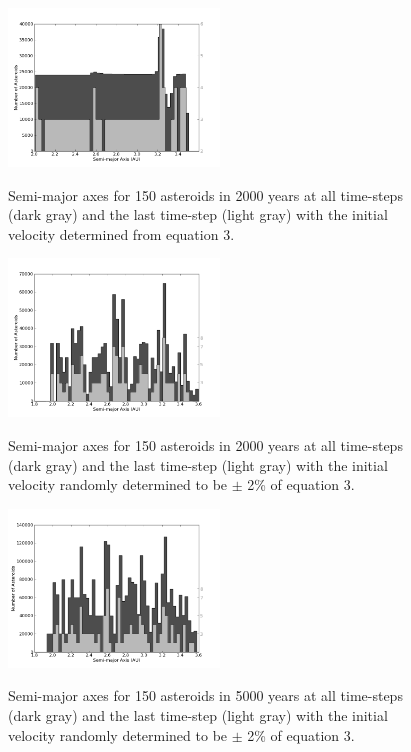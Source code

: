 \documentclass{article}%
\begin{document}
\begin{figure}[H]
	\centering
		\includegraphics[width=0.50\textwidth]{images/edits/hist150ast2000yr.png}
	\label{fig:150 asteroids initial unchanged}
	\caption{Semi-major axes for 150 asteroids in 2000 years at all time-steps 
	         (dark gray) and the last time-step (light gray) with the initial 
	         velocity determined from equation 3.}
\end{figure}

\begin{figure}[H]
	\centering
		\includegraphics[width=0.50\textwidth]{images/edits/hist150ast2000yr2perRand.png}
	\label{fig:150 asteroids initial v 2perRand}
	\caption{Semi-major axes for 150 asteroids in 2000 years at all time-steps 
	         (dark gray) and the last time-step (light gray) with the initial 
	         velocity randomly determined to be $\pm$ 2\% of equation 3.}
\end{figure}

\begin{figure}[H]
	\centering
		\includegraphics[width=0.50\textwidth]{images/edits/hist150ast5000yr2perRand.png}
	\label{fig:150 asteroids initial v 2perRand}
	\caption{Semi-major axes for 150 asteroids in 5000 years at all time-steps 
	         (dark gray) and the last time-step (light gray) with the initial 
	         velocity randomly determined to be $\pm$ 2\% of equation 3.}
\end{figure}
\end{document}
